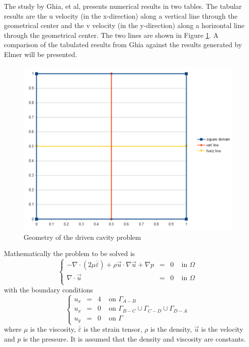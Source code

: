 The study by Ghia, et al, presents numerical results in two tables.  The tabular results are the u velocity (in the x-direction) along a vertical line through the geometrical center and the v velocity (in the y-direction) along a horizontal line through the geometrical center.  The two lines are shown in Figure \ref{fg:DC_geometry}.  A comparison of the tabulated results from Ghia against the results generated by Elmer will be presented.\\

\begin{figure}[H]
\centering
\includegraphics[scale=1.2]{DC_geometry}
\caption{Geometry of the driven cavity problem}\label{fg:DC_geometry}
\end{figure}  

Mathematically the problem to be solved is
\begin{equation}
\left \{
\begin{array}{rccl}
- \nabla \cdot (2 \mu \overline{\overline{\varepsilon}}) + \rho 
\vec{u} \cdot \nabla \vec{u} + \nabla p & = & 0 & \mbox{ in } \Omega \\
\nabla \cdot \vec{u} & = & 0 & \mbox{ in } \Omega \\
\end{array}
\right .
\end{equation}
%
with the boundary conditions
\begin{equation}
\left \{
\begin{array}{rccl}
u_x & = & 4 	 & \mbox{ on } \Gamma_{A-B} \\
u_x & = & 0 & \mbox{ on } \Gamma_{B-C} \cup \Gamma_{C-D} \cup \Gamma_{D-A} \\
u_y & = & 0 & \mbox{ on } \Gamma  
\end{array}
\right .
\end{equation}
where $\mu$ is the viscosity, $\overline{\overline{\varepsilon}}$ is 
the strain tensor,  $\rho$ is the density, $\vec{u}$ is the velocity and
$p$ is the pressure. It is assumed that the density and viscosity are 
constants. 

